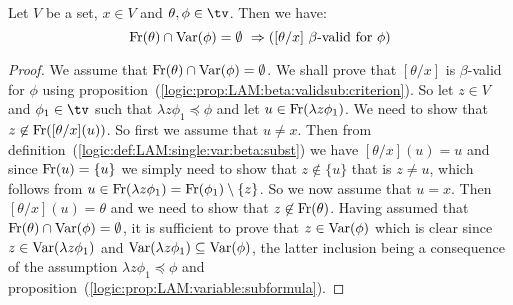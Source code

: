 \begin{prop}\label{logic:prop:LAM:beta:validsub:singlevar}
    Let $V$ be a set, $x\in V$ and $\theta,\phi\in\tv$. Then we have:
        \[
            \mbox{\rm Fr}(\theta)\cap\mbox{\rm Var}(\phi)=\emptyset\
                \Rightarrow
            (\mbox{$[\theta/x]$ $\beta$-valid for $\phi$})
        \]
\end{prop}
\begin{proof}
    We assume that $\mbox{\rm Fr}(\theta)\cap\mbox{\rm Var}(\phi)=\emptyset$. We shall prove
    that $[\theta/x]$ is $\beta$-valid for $\phi$ using 
    proposition~(\ref{logic:prop:LAM:beta:validsub:criterion}). 
    So let $z\in V$ and $\phi_{1}\in\tv$ such that $\lambda z\phi_{1}
    \preceq\phi$ and let $u\in\mbox{\rm Fr}(\lambda z\phi_{1})$. We need to show 
    that $z\not\in\mbox{\rm Fr}([\theta/x](u))$. So first we assume that $u\neq x$. 
    Then from definition~(\ref{logic:def:LAM:single:var:beta:subst}) we have
    $[\theta/x](u)=u$ and since $\mbox{\rm Fr}(u)=\{u\}$ we simply need to show that
    $z\not\in\{u\}$ that is $z\neq u$, which follows from $u\in\mbox{\rm Fr}(\lambda
    z\phi_{1})=\mbox{\rm Fr}(\phi_{1})\setminus\{z\}$. So we now assume that $u=x$.
    Then $[\theta/x](u)=\theta$ and we need to show that $z\not\in\mbox{\rm Fr}(\theta)$.
    Having assumed that $\mbox{\rm Fr}(\theta)\cap\mbox{\rm Var}(\phi)=\emptyset$, it is sufficient
    to prove that $z\in\mbox{\rm Var}(\phi)$ which is clear since $z\in\mbox{\rm Var}(\lambda z
    \phi_{1})$ and $\mbox{\rm Var}(\lambda z\phi_{1})\subseteq\mbox{\rm Var}(\phi)$, the latter
    inclusion being a consequence of the assumption $\lambda z\phi_{1}\preceq
    \phi$ and proposition~(\ref{logic:prop:LAM:variable:subformula}).
\end{proof}
